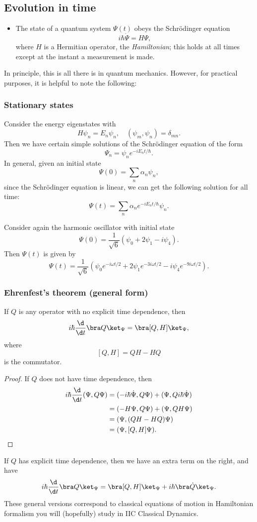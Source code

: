 \documentclass[a4paper]{article}
\begin{document}
\subsection{Evolution in time}
\begin{itemize}
  \item The state of a quantum system $\Psi(t)$ obeys the Schr\"odinger equation
    \[
      i\hbar \dot{\Psi} = H\Psi,
    \]
    where $H$ is a Hermitian operator, the \emph{Hamiltonian}; this holds at all times except at the instant a measurement is made.
\end{itemize}
In principle, this is all there is in quantum mechanics. However, for practical purposes, it is helpful to note the following:

\subsubsection*{Stationary states}
Consider the energy eigenstates with
\[
  H\psi_n = E_n \psi_n,\quad (\psi_m, \psi_n) = \delta_{mn}.
\]
Then we have certain simple solutions of the Schr\"odinger equation of the form
\[
  \Psi_n = \psi_n e^{-iE_n t/\hbar}.
\]
In general, given an initial state
\[
  \Psi(0) = \sum_n \alpha_n \psi_n,
\]
since the Schr\"odinger equation is linear, we can get the following solution for all time:
\[
  \Psi(t) = \sum_n \alpha_n e^{-iE_n t/\hbar} \psi_n.
\]
\begin{eg}
  Consider again the harmonic oscillator with initial state
  \[
    \Psi(0) = \frac{1}{\sqrt{6}}(\psi_0 + 2\psi_1 - i \psi_4).
  \]
  Then $\Psi(t)$ is given by
  \[
    \Psi(t) = \frac{1}{\sqrt{6}} (\psi_0 e^{-i\omega t/2} + 2\psi_1e^{-3i\omega t/2} - i \psi_4 e^{-9i\omega t/2}).
  \]
\end{eg}

\subsubsection*{Ehrenfest's theorem (general form)}
\begin{thm}
  If $Q$ is any operator with no explicit time dependence, then
  \[
    i\hbar \frac{\d}{\d t}\bra Q\ket_\Psi = \bra [Q, H]\ket_\Psi,
  \]
  where
  \[
    [Q, H] = QH - HQ
  \]
  is the commutator.
\end{thm}

\begin{proof}
  If $Q$ does not have time dependence, then
  \begin{align*}
    i\hbar \frac{\d}{\d t}(\Psi, Q\Psi) &= (-i\hbar \dot\Psi, Q\Psi) + (\Psi, Q i\hbar \dot\Psi)\\
    &= (-H\Psi, Q\Psi) + (\Psi, QH \Psi)\\
    &= (\Psi, (QH - HQ)\Psi)\\
    &= (\Psi, [Q, H] \Psi).\qedhere
  \end{align*}
\end{proof}
If $Q$ has explicit time dependence, then we have an extra term on the right, and have
\[
  i\hbar \frac{\d}{\d t}\bra Q\ket_\Psi = \bra [Q, H]\ket_\Psi + i\hbar \bra \dot{Q} \ket_\Psi.
\]
These general versions correspond to classical equations of motion in Hamiltonian formalism you will (hopefully) study in IIC Classical Dynamics.
\end{document}

